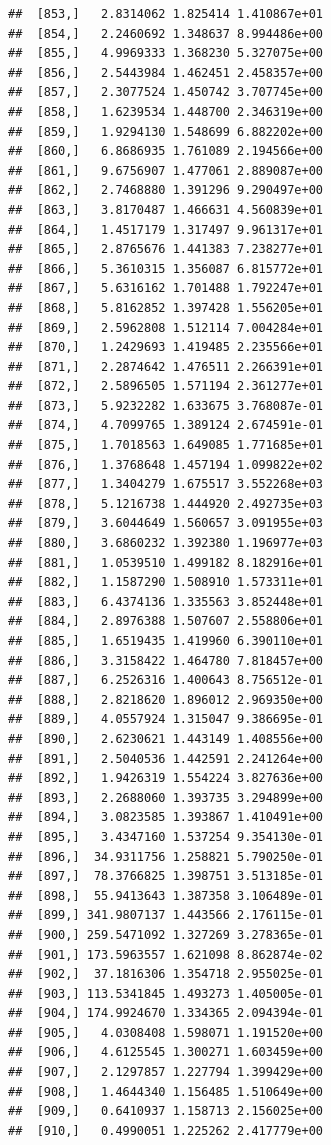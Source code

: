 \documentclass[article]{jss}\usepackage[]{graphicx}\usepackage[]{xcolor}
\makeatletter
\newenvironment{kframe}{%
 \def\at@end@of@kframe{}%
 \ifinner\ifhmode%
  \def\at@end@of@kframe{\end{minipage}}%
  \begin{minipage}{\columnwidth}%
 \fi\fi%
 \def\FrameCommand##1{\hskip\@totalleftmargin \hskip-\fboxsep
 \colorbox{shadecolor}{##1}\hskip-\fboxsep
     \hskip-\linewidth \hskip-\@totalleftmargin \hskip\columnwidth}%
 \MakeFramed {\advance\hsize-\width
   \@totalleftmargin\z@ \linewidth\hsize
   \@setminipage}}%
 {\par\unskip\endMakeFramed%
 \at@end@of@kframe}
\newenvironment{knitrout}{}{} %
\makeatother
\begin{document}
\begin{knitrout}
\begin{kframe}
\begin{verbatim}
##  [853,]   2.8314062 1.825414 1.410867e+01
##  [854,]   2.2460692 1.348637 8.994486e+00
##  [855,]   4.9969333 1.368230 5.327075e+00
##  [856,]   2.5443984 1.462451 2.458357e+00
##  [857,]   2.3077524 1.450742 3.707745e+00
##  [858,]   1.6239534 1.448700 2.346319e+00
##  [859,]   1.9294130 1.548699 6.882202e+00
##  [860,]   6.8686935 1.761089 2.194566e+00
##  [861,]   9.6756907 1.477061 2.889087e+00
##  [862,]   2.7468880 1.391296 9.290497e+00
##  [863,]   3.8170487 1.466631 4.560839e+01
##  [864,]   1.4517179 1.317497 9.961317e+01
##  [865,]   2.8765676 1.441383 7.238277e+01
##  [866,]   5.3610315 1.356087 6.815772e+01
##  [867,]   5.6316162 1.701488 1.792247e+01
##  [868,]   5.8162852 1.397428 1.556205e+01
##  [869,]   2.5962808 1.512114 7.004284e+01
##  [870,]   1.2429693 1.419485 2.235566e+01
##  [871,]   2.2874642 1.476511 2.266391e+01
##  [872,]   2.5896505 1.571194 2.361277e+01
##  [873,]   5.9232282 1.633675 3.768087e-01
##  [874,]   4.7099765 1.389124 2.674591e-01
##  [875,]   1.7018563 1.649085 1.771685e+01
##  [876,]   1.3768648 1.457194 1.099822e+02
##  [877,]   1.3404279 1.675517 3.552268e+03
##  [878,]   5.1216738 1.444920 2.492735e+03
##  [879,]   3.6044649 1.560657 3.091955e+03
##  [880,]   3.6860232 1.392380 1.196977e+03
##  [881,]   1.0539510 1.499182 8.182916e+01
##  [882,]   1.1587290 1.508910 1.573311e+01
##  [883,]   6.4374136 1.335563 3.852448e+01
##  [884,]   2.8976388 1.507607 2.558806e+01
##  [885,]   1.6519435 1.419960 6.390110e+01
##  [886,]   3.3158422 1.464780 7.818457e+00
##  [887,]   6.2526316 1.400643 8.756512e-01
##  [888,]   2.8218620 1.896012 2.969350e+00
##  [889,]   4.0557924 1.315047 9.386695e-01
##  [890,]   2.6230621 1.443149 1.408556e+00
##  [891,]   2.5040536 1.442591 2.241264e+00
##  [892,]   1.9426319 1.554224 3.827636e+00
##  [893,]   2.2688060 1.393735 3.294899e+00
##  [894,]   3.0823585 1.393867 1.410491e+00
##  [895,]   3.4347160 1.537254 9.354130e-01
##  [896,]  34.9311756 1.258821 5.790250e-01
##  [897,]  78.3766825 1.398751 3.513185e-01
##  [898,]  55.9413643 1.387358 3.106489e-01
##  [899,] 341.9807137 1.443566 2.176115e-01
##  [900,] 259.5471092 1.327269 3.278365e-01
##  [901,] 173.5963557 1.621098 8.862874e-02
##  [902,]  37.1816306 1.354718 2.955025e-01
##  [903,] 113.5341845 1.493273 1.405005e-01
##  [904,] 174.9924670 1.334365 2.094394e-01
##  [905,]   4.0308408 1.598071 1.191520e+00
##  [906,]   4.6125545 1.300271 1.603459e+00
##  [907,]   2.1297857 1.227794 1.399429e+00
##  [908,]   1.4644340 1.156485 1.510649e+00
##  [909,]   0.6410937 1.158713 2.156025e+00
##  [910,]   0.4990051 1.225262 2.417779e+00

\end{verbatim}
\end{kframe}
\end{knitrout}
\end{document}
